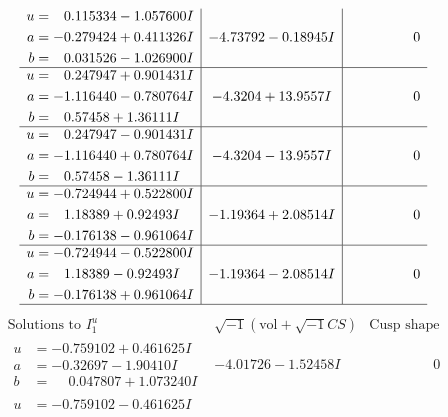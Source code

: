 \documentclass[1p]{elsarticle_modified}
\theoremstyle{definition}
\newcommand{\I}{\sqrt{-1}}
\begin{document}
$$\begin{array}{c|c|c}
\begin{aligned}
u &= \phantom{-}0.115334 - 1.057600 I \\
a &= -0.279424 + 0.411326 I \\
b &= \phantom{-}0.031526 - 1.026900 I\end{aligned}
 & -4.73792 - 0.18945 I & \phantom{-0.000000 } 0 \\ \hline\begin{aligned}
u &= \phantom{-}0.247947 + 0.901431 I \\
a &= -1.116440 - 0.780764 I \\
b &= \phantom{-}0.57458 + 1.36111 I\end{aligned}
 & -4.3204 + 13.9557 I & \phantom{-0.000000 } 0 \\ \hline\begin{aligned}
u &= \phantom{-}0.247947 - 0.901431 I \\
a &= -1.116440 + 0.780764 I \\
b &= \phantom{-}0.57458 - 1.36111 I\end{aligned}
 & -4.3204 - 13.9557 I & \phantom{-0.000000 } 0 \\ \hline\begin{aligned}
u &= -0.724944 + 0.522800 I \\
a &= \phantom{-}1.18389 + 0.92493 I \\
b &= -0.176138 - 0.961064 I\end{aligned}
 & -1.19364 + 2.08514 I & \phantom{-0.000000 } 0 \\ \hline\begin{aligned}
u &= -0.724944 - 0.522800 I \\
a &= \phantom{-}1.18389 - 0.92493 I \\
b &= -0.176138 + 0.961064 I\end{aligned}
 & -1.19364 - 2.08514 I & \phantom{-0.000000 } 0\\
 \hline 
 \end{array}$$\newpage$$\begin{array}{c|c|c}  
\text{Solutions to }I^u_{1}& \I (\text{vol} + \sqrt{-1}CS) & \text{Cusp shape}\\
 \hline 
\begin{aligned}
u &= -0.759102 + 0.461625 I \\
a &= -0.32697 - 1.90410 I \\
b &= \phantom{-}0.047807 + 1.073240 I\end{aligned}
 & -4.01726 - 1.52458 I & \phantom{-0.000000 } 0 \\ \hline\begin{aligned}
u &= -0.759102 - 0.461625 I \\

\end{aligned}
\end{array}$$
\end{document}
